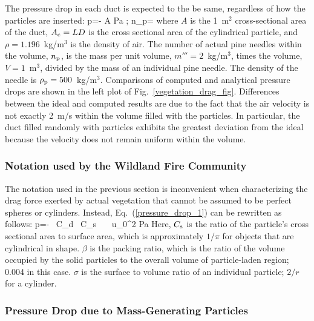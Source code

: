 \documentclass[11pt]{book}
\begin{document}
The pressure drop in each duct is expected to the be same, regardless of how the particles are inserted:
\be
   \Delta p=- \rho {} {A}  \; {\rm Pa}  \quad ; \quad n_{\rm p}=   \label{pressure_drop_1}
\ee
where $A$ is the 1~m$^2$ cross-sectional area of the duct, $A_{\rm c}=LD$ is the cross sectional area of the cylindrical particle, and $\rho=1.196$~kg/m$^3$ is the density of air. The number of actual pine needles within the volume, $n_{\rm p}$, is the mass per unit volume, $m'''=2$~kg/m$^3$, times the volume, $V=1$~m$^3$, divided by the mass of an individual pine needle. The density of the needle is $\rho_{\rm p}=500$~kg/m$^3$. Comparisons of computed and analytical pressure drops are shown in the left plot of Fig.~\ref{vegetation_drag_fig}. Differences between the ideal and computed results are due to the fact that the air velocity is not exactly 2~m/s within the volume filled with the particles. In particular, the duct filled randomly with particles exhibits the greatest deviation from the ideal because the velocity does not remain uniform within the volume.

\subsubsection{Notation used by the Wildland Fire Community}

The notation used in the previous section is inconvenient when characterizing the drag force exerted by actual vegetation that cannot be assumed to be perfect spheres or cylinders. Instead, Eq.~(\ref{pressure_drop_1}) can be rewritten as follows:
\be
   \Delta p=- \rho \, C_{\rm d} \, C_{\rm s} \, \beta \, \sigma \, u_0^2  \; {\rm Pa}  \label{pressure_drop_2}
\ee
Here, $C_{\rm s}$ is the ratio of the particle's cross sectional area to surface area, which is approximately $1/\pi$ for objects that are cylindrical in shape. $\beta$ is the packing ratio, which is the ratio of the volume occupied by the solid particles to the overall volume of particle-laden region; 0.004 in this case. $\sigma$ is the surface to volume ratio of an individual particle; $2/r$ for a cylinder.

\subsubsection{Pressure Drop due to Mass-Generating Particles}
\end{document}

